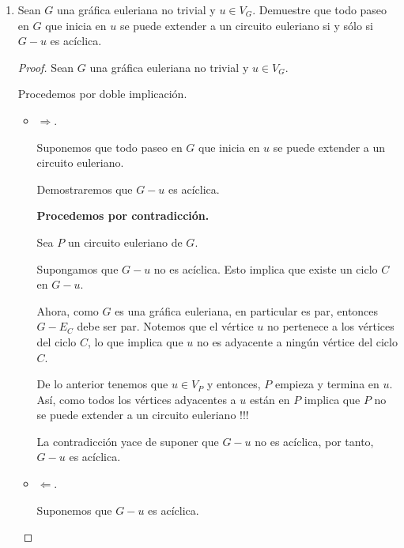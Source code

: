 \documentclass{article}
\begin{document}
\begin{enumerate}
\begin{proof}
    Como en cualquiera de los casos anteriores hay una cantidad par de fichas, entonces podemos agrupar
    conjuntos [aristas] de orden $2$ con las fichas [vértices] y obtendremos una gráfica par, pues cada
    ficha se relacionará con exactamente $2$, luego, los ordenes $n$ en el dominó, siempre que $n$ sea
    par, forman gráficas eulerianas, luego por el teorema de caracterización de gráficas eulerianas tenemos
    que esta es un ciclo.
  \end{proof}
\item Sean $G$ una gr\'afica euleriana no trivial
  y $u \in V_G$. Demuestre que todo paseo en $G$
  que inicia en $u$ se puede extender a un circuito
  euleriano si y s\'olo si $G-u$ es ac\'iclica.

  \begin{proof}
    Sean $G$ una gr\'afica euleriana no trivial y $u \in V_{G}$.

    Procedemos por doble implicación.

    \begin{itemize}
      \item $\Longrightarrow$.

        Suponemos que todo paseo en $G$ que inicia en $u$ se puede extender a un circuito euleriano.

        Demostraremos que $G-u$ es ac\'iclica.

        \textbf{Procedemos por contradicción.}

        Sea $P$ un circuito euleriano de $G$.

        Supongamos que $G-u$ no es ac\'iclica. Esto implica que existe un ciclo $C$ en $G-u$.

        Ahora, como $G$ es una gráfica euleriana, en particular es par, entonces $G - E_{C}$ debe ser par. Notemos que el vértice $u$ no pertenece a los vértices del ciclo $C$, lo que implica que $u$ no es adyacente a ningún vértice del ciclo $C$.

        De lo anterior tenemos que $u \in V_{P}$ y entonces, $P$ empieza y termina en $u$. Así, como todos los vértices adyacentes a $u$ están en $P$ implica que $P$ no se puede extender a un circuito euleriano !!!

        La contradicción yace de suponer que $G - u$ no es acíclica, por tanto, $G - u$ es acíclica.

      \item $\Longleftarrow$.

        Suponemos que $G-u$ es ac\'iclica.


\end{itemize}
\end{proof}
\end{enumerate}
\end{document}
